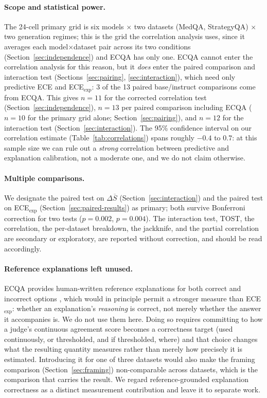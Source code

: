 \documentclass[letterpaper]{article} %
\begin{document}
\paragraph{Scope and statistical power.} The 24-cell primary grid is six models $\times$ two datasets (MedQA, StrategyQA) $\times$ two generation regimes; this is the grid the correlation analysis uses, since it averages each model$\times$dataset pair across its two conditions (Section~\ref{sec:independence}) and ECQA has only one. ECQA cannot enter the correlation analysis for this reason, but it \emph{does} enter the paired comparison and interaction test (Sections~\ref{sec:pairing}, \ref{sec:interaction}), which need only predictive ECE and ECE$_{\text{exp}}$: 3 of the 13 paired base/instruct comparisons come from ECQA. This gives $n{=}11$ for the corrected correlation test (Section~\ref{sec:independence}), $n{=}13$ per paired comparison including ECQA ($n{=}10$ for the primary grid alone; Section~\ref{sec:pairing}), and $n{=}12$ for the interaction test (Section~\ref{sec:interaction}). The 95\% confidence interval on our correlation estimate (Table~\ref{tab:correlations}) spans roughly $-0.4$ to $0.7$: at this sample size we can rule out a \emph{strong} correlation between predictive and explanation calibration, not a moderate one, and we do not claim otherwise. \paragraph{Multiple comparisons.} We designate the paired test on $\Delta\overline{S}$ (Section~\ref{sec:interaction}) and the paired test on ECE$_{\text{exp}}$ (Section~\ref{sec:paired-results}) as primary; both survive Bonferroni correction for two tests ($p{=}0.002$, $p{=}0.004$). The interaction test, TOST, the correlation, the per-dataset breakdown, the jackknife, and the partial correlation are secondary or exploratory, are reported without correction, and should be read accordingly. \paragraph{Reference explanations left unused.} ECQA provides human-written reference explanations for both correct and incorrect options \citep{aggarwaletal2021ecqa}, which would in principle permit a stronger measure than ECE$_{\text{exp}}$: whether an explanation's \emph{reasoning} is correct, not merely whether the answer it accompanies is. We do not use them here. Doing so requires committing to how a judge's continuous agreement score becomes a correctness target (used continuously, or thresholded, and if thresholded, where) and that choice changes what the resulting quantity measures rather than merely how precisely it is estimated. Introducing it for one of three datasets would also make the framing comparison (Section~\ref{sec:framing}) non-comparable across datasets, which is the comparison that carries the result. We regard reference-grounded explanation correctness as a distinct measurement contribution and leave it to separate work. 
\end{document}
